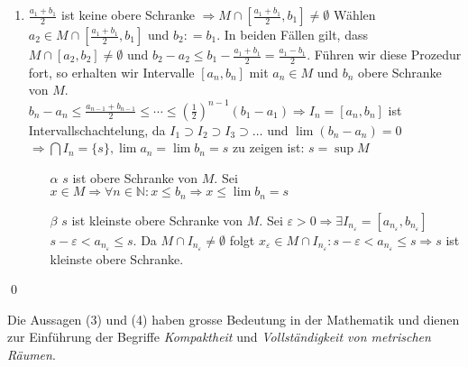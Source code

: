 \documentclass[ngerman,titlepage,twoside, parskip=half*]{scrreprt}
\newcommand*{\N}{\mathbb{N}}
\theoremstyle{plain}
\theoremstyle{definition}
\theoremstyle{remark}
\newcommand*{\coloneqq}{\mathrel{\mathop:}=}
\begin{document}
\begin{itemize}
\begin{enumerate}[1. F{a}ll]
\begin{enumerate}[{2}.1. F{a}ll]
	\item $\frac{a_1+b_1}{2}$ ist keine obere Schranke $\Rightarrow M \cap [\frac{a_1+b_1}{2},b_1]\neq \emptyset$
	  Wählen $a_2 \in M \cap [\frac{a_1+b_1}{2},b_1]$ und $b_2\coloneqq b_1$. In beiden Fällen gilt, dass $M\cap [a_2,b_2]
	  \neq \emptyset$ und $b_2-a_2\leq b_1-\frac{a_1+b_1}{2}=\frac{a_1-b_1}{2}$. Führen wir diese Prozedur fort, so
	  erhalten wir Intervalle $[a_n,b_n]$ mit $a_n \in M$ und $b_n$ obere Schranke von $M$.\\
	  $b_n-a_n\leq \frac{a_{n-1}+b_{n-1}}{2}\leq \cdots \leq (\frac{1}{2})^{n-1}(b_1-a_1)\Rightarrow I_n=[a_n,b_n]$
	  ist Intervallschachtelung, da $I_1\supset I_2\supset I_3\supset \ldots$ und $\lim (b_n-a_n)=0$\\
	  $\Rightarrow \bigcap I_n =\{s\}, \lim a_n=\lim b_n=s$ zu zeigen ist: $s=\sup M$
	  \begin{itemize}
	    \item[$\alpha$] $s$ ist obere Schranke von $M$. Sei $x \in M \Rightarrow \forall n \in \N \colon x \leq b_n
	      \Rightarrow x \leq \lim b_n =s$
	    \item[$\beta$] $s$ ist kleinste obere Schranke von $M$. Sei $\varepsilon >0\Rightarrow \exists I_{n_{\varepsilon}}=
	      [a_{n_{\varepsilon}},b_{n_{\varepsilon}}]$\\
	      $s-\varepsilon <a_{n_{\varepsilon}}\leq s$. Da $M\cap I_{n_{\varepsilon}}\neq \emptyset$ folgt $x_{\varepsilon}
	      \in M \cap I_{n_{\varepsilon}}\colon s-\varepsilon<a_{n_{\varepsilon}}\leq s\Rightarrow s$ ist kleinste obere
	      Schranke.
	  \end{itemize}
      \end{enumerate}
    \end{enumerate}
\end{itemize}
\qed

Die Aussagen (3) und (4) haben grosse Bedeutung in der Mathematik und dienen zur Einführung der Begriffe
\emph{Kompaktheit} und \emph{Vollständigkeit von metrischen Räumen}.
\end{document}
